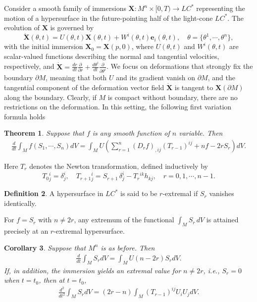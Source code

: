\documentclass[reqno,11pt, letterpaper]{amsart}
\theoremstyle{plain}
\newtheorem{thm}{Theorem}[section]
\newtheorem{cor}[thm]{Corollary}
\theoremstyle{definition}
\newtheorem{defn}[thm]{Definition}
\numberwithin{equation}{section}
\begin{document}
Consider a smooth family of immersions $\mathbf{X}:M^n\times[0,T)\rightarrow LC^*$ representing the motion of a hypersurface in the future-pointing half of the light-cone $LC^*$.
The evolution of $\mathbf{X}$ is governed by
    \begin{equation*}\label{basic-flow}
       \dot{\mathbf{X}}(\theta,t)= U(\theta,t) \mathbf{X}(\theta,t)+W^i(\theta,t)\mathbf{e}_i(\theta,t), \quad \theta=\{\theta^1,\cdots,\theta^n\},
    \end{equation*}
    with the initial immersion $\mathbf{X}_0=\mathbf{X}(p,0)$, where $U(\theta,t)$ and $W^i(\theta,t)$ are scalar-valued functions describing the normal and tangential velocities, respectively, and $\displaystyle \dot{\mathbf{X}}=\frac{dr}{dt}\frac{\partial}{\partial r}+\frac{d\theta^i}{dt}\frac{\partial}{\partial\theta^i}$.
We focus on deformations that strongly fix the boundary $\partial M$, meaning that both $U$ and its gradient vanish on $\partial M$, and the tangential component of the deformation vector field $\dot{\mathbf{X}}$ is tangent to $\mathbf{X}(\partial M)$ along the boundary. Clearly, if $M$ is compact without boundary, there are no restrictions on the deformation. In this setting, the following first variation formula holds
\begin{thm}\label{main thm A}
       Suppose that $f$ is any smooth function of $n$ variable. Then
       \begin{align*}
         \frac{d}{dt}\int_Mf(S_1,\cdots,S_n)dV=\int_MU\left(\sum_{r=1}^n\left(D_rf\right)_{,ij}\left(T_{r-1}\right)^{ij}+nf-2rS_r\right)dV.
       \end{align*}
\end{thm}
Here $T_r$ denotes the Newton transformation, defined inductively by
$$
T_0{}^i_j=\delta^i_j,\quad 
T_{r+1}{}^i_j=S_{r+1}\,\delta^i_j - T_{r}{}^{ik} h_{kj}, \quad r=0,1,\cdots, n-1.
$$

\begin{defn} A hypersurface in $LC^*$ is said to be $r$-extremal if $S_r$ vanishes identically.
\end{defn}
For $f = S_r$ with $n \neq 2r$, any extremum of the functional $\int_M S_r\,dV$ is attained precisely at an $r$-extremal hypersurface.
\begin{cor}\label{1 var}
       Suppose that $M^n$ is as before. Then
       \begin{align*}
          \frac{d}{dt}\int_MS_rdV=\int_M U(n-2r)S_rdV.
       \end{align*}
       If, in addition, the immersion yields an extremal value for $n\neq 2r$, i.e., $S_r=0$ when $t=t_0$, then at $t=t_0$,
       \begin{align*}
         \frac{d^2}{dt^2}\int_MS_rdV=(2r-n)\int_M\left(T_{r-1}\right)^{ij}U_iU_jdV.
       \end{align*}
\end{cor}
\end{document}
